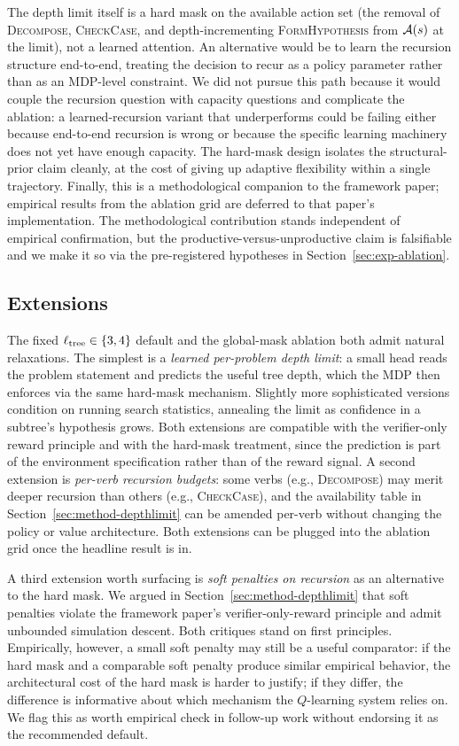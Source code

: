 The depth limit itself is a hard mask on the available action set (the
removal of \textsc{Decompose}, \textsc{CheckCase}, and depth-incrementing
\textsc{FormHypothesis} from $\mathcal{A}(s)$ at the limit), not a learned
attention. An alternative would be to learn the recursion structure
end-to-end, treating the decision to recur as a policy parameter rather
than as an MDP-level constraint. We did not pursue this path because it
would couple the recursion question with capacity questions and complicate
the ablation: a learned-recursion variant that underperforms could be
failing either because end-to-end recursion is wrong or because the
specific learning machinery does not yet have enough capacity. The
hard-mask design isolates the structural-prior claim cleanly, at the cost
of giving up adaptive flexibility within a single trajectory. Finally,
this is a methodological companion to the framework paper; empirical
results from the ablation grid are deferred to that paper's
implementation. The methodological contribution stands independent of
empirical confirmation, but the productive-versus-unproductive claim is
falsifiable and we make it so via the pre-registered hypotheses in
Section~\ref{sec:exp-ablation}.

\subsection{Extensions}
\label{sec:disc-extensions}

The fixed $\ell_{\mathrm{tree}} \in \{3, 4\}$ default and the global-mask ablation
both admit natural relaxations. The simplest is a \emph{learned per-problem
depth limit}: a small head reads the problem statement and predicts the
useful tree depth, which the MDP then enforces via the same hard-mask
mechanism. Slightly more sophisticated versions condition on running
search statistics, annealing the limit as confidence in a subtree's
hypothesis grows. Both extensions are compatible with the verifier-only
reward principle and with the hard-mask treatment, since the prediction
is part of the environment specification rather than of the reward
signal. A second extension is \emph{per-verb recursion budgets}: some
verbs (e.g., \textsc{Decompose}) may merit deeper recursion than others
(e.g., \textsc{CheckCase}), and the availability table in
Section~\ref{sec:method-depthlimit} can be amended per-verb without
changing the policy or value architecture. Both extensions can be
plugged into the ablation grid once the headline result is in.

A third extension worth surfacing is \emph{soft penalties on recursion}
as an alternative to the hard mask. We argued in
Section~\ref{sec:method-depthlimit} that soft penalties violate the
framework paper's verifier-only-reward principle and admit unbounded
simulation descent. Both critiques stand on first principles. Empirically,
however, a small soft penalty may still be a useful comparator: if the
hard mask and a comparable soft penalty produce similar empirical
behavior, the architectural cost of the hard mask is harder to justify;
if they differ, the difference is informative about which mechanism the
$Q$-learning system relies on. We flag this as worth empirical check in
follow-up work without endorsing it as the recommended default.

